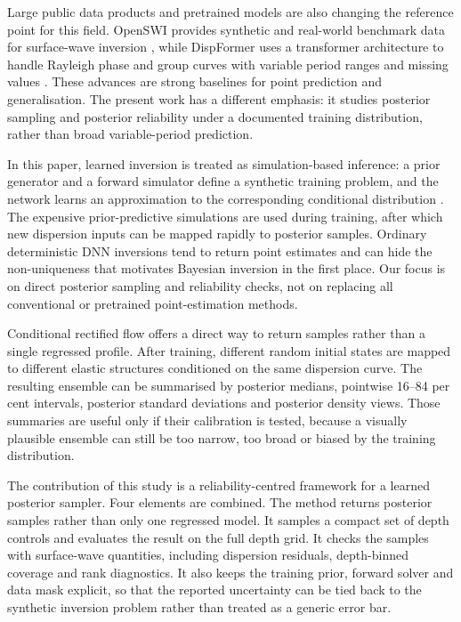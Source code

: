 \documentclass[referee]{gji}
\begin{document}
Large public data products and pretrained models are also changing the reference point for this field. OpenSWI provides synthetic and real-world benchmark data for surface-wave inversion \citep{LiuEtAl2026OpenSWI}, while DispFormer uses a transformer architecture to handle Rayleigh phase and group curves with variable period ranges and missing values \citep{LiuEtAl2025DispFormer}. These advances are strong baselines for point prediction and generalisation. The present work has a different emphasis: it studies posterior sampling and posterior reliability under a documented training distribution, rather than broad variable-period prediction.

In this paper, learned inversion is treated as simulation-based inference: a prior generator and a forward simulator define a synthetic training problem, and the network learns an approximation to the corresponding conditional distribution \citep{CranmerEtAl2020}. The expensive prior-predictive simulations are used during training, after which new dispersion inputs can be mapped rapidly to posterior samples. Ordinary deterministic DNN inversions tend to return point estimates and can hide the non-uniqueness that motivates Bayesian inversion in the first place. Our focus is on direct posterior sampling and reliability checks, not on replacing all conventional or pretrained point-estimation methods.

Conditional rectified flow offers a direct way to return samples rather than a single regressed profile. After training, different random initial states are mapped to different elastic structures conditioned on the same dispersion curve. The resulting ensemble can be summarised by posterior medians, pointwise 16--84 per cent intervals, posterior standard deviations and posterior density views. Those summaries are useful only if their calibration is tested, because a visually plausible ensemble can still be too narrow, too broad or biased by the training distribution.

The contribution of this study is a reliability-centred framework for a learned posterior sampler. Four elements are combined. The method returns posterior samples rather than only one regressed model. It samples a compact set of depth controls and evaluates the result on the full depth grid. It checks the samples with surface-wave quantities, including dispersion residuals, depth-binned coverage and rank diagnostics. It also keeps the training prior, forward solver and data mask explicit, so that the reported uncertainty can be tied back to the synthetic inversion problem rather than treated as a generic error bar.
\end{document}
